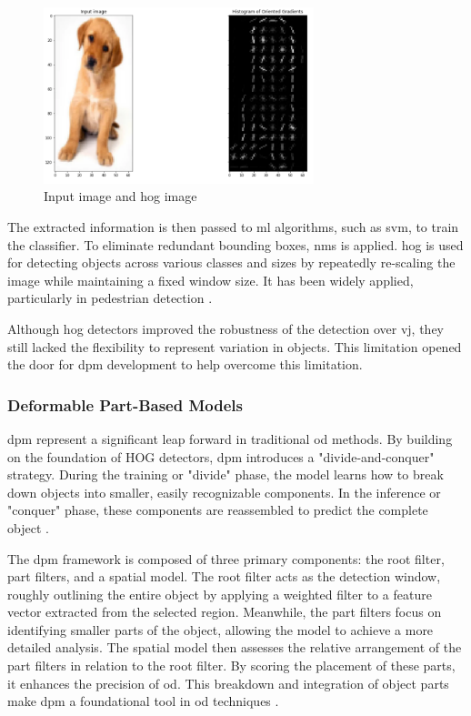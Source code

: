 \begin{figure}[ht]
    \centering
    \includegraphics[width=0.7\textwidth]{Figures/HOG_Histogram_image.PNG} 
    \caption{Input image and \gls{hog} image \cite{HOG}}
    \label{HOG_image}
\end{figure}

The extracted information is then passed to \gls{ml} algorithms, such as \gls{svm}, to train the classifier. To eliminate redundant bounding boxes, \gls{nms} is applied. \gls{hog} is used for detecting objects across various classes and sizes by repeatedly re-scaling the image while maintaining a fixed window size. It has been widely applied, particularly in pedestrian detection \cite{oD_Review}.

Although \gls{hog} detectors improved the robustness of the detection over \gls{vj}, they still lacked the flexibility to represent variation in objects. This limitation opened the door for \gls{dpm} development to help overcome this limitation.

\subsubsection{Deformable Part-Based Models}
\gls{dpm} represent a significant leap forward in traditional \gls{od} methods. By building on the foundation of HOG detectors, \gls{dpm} introduces a "divide-and-conquer" strategy. During the training or "divide" phase, the model learns how to break down objects into smaller, easily recognizable components. In the inference or "conquer" phase, these components are reassembled to predict the complete object \cite{oD_Review}.

The \gls{dpm} framework is composed of three primary components: the root filter, part filters, and a spatial model. The root filter acts as the detection window, roughly outlining the entire object by applying a weighted filter to a feature vector extracted from the selected region. Meanwhile, the part filters focus on identifying smaller parts of the object, allowing the model to achieve a more detailed analysis. The spatial model then assesses the relative arrangement of the part filters in relation to the root filter. By scoring the placement of these parts, it enhances the precision of \gls{od}. This breakdown and integration of object parts make \gls{dpm} a foundational tool in \gls{od} techniques \cite{oD_Review}.

